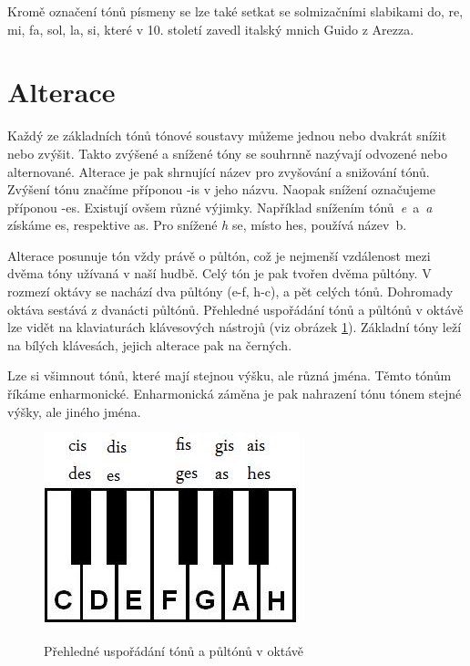 Kromě označení tónů písmeny se lze také setkat se solmizačními slabikami do, re, mi, fa, sol, la, si,
které v 10. století zavedl italský mnich Guido z Arezza.
\cite{cmiral}
\par    

\section{Alterace}
Každý ze základních tónů tónové soustavy můžeme jednou nebo dvakrát snížit nebo zvýšit.
Takto zvýšené a snížené tóny se souhrnně nazývají odvozené nebo alternované.
Alterace je pak shrnující název pro zvyšování a snižování tónů.
Zvýšení tónu značíme příponou -is v jeho názvu.
Naopak snížení označujeme příponou -es.
Existují ovšem různé výjimky.
Například snížením tónů\emph{~e}~a\emph{~a} získáme es, respektive as.
Pro snížené \emph{h} se, místo hes, používá název~b.
\cite{zenkl}
\par

Alterace posunuje tón vždy právě o půltón, 
což je nejmenší vzdálenost mezi dvěma tóny užívaná v naší hudbě.
Celý tón je pak tvořen dvěma půltóny. 
V rozmezí oktávy se nachází dva půltóny ({e-f, h-c}), a pět celých tónů.
Dohromady oktáva sestává z dvanácti půltónů.
Přehledné uspořádání tónů a půltónů v oktávě lze vidět na klaviaturách klávesových nástrojů (viz obrázek \ref{obrazekRozlozeniKlaviatury}).
Základní tóny leží na bílých klávesách, jejich alterace pak na černých.
\cite{zenkl,cmiral}
\par

Lze si všimnout tónů, které mají stejnou výšku, ale různá jména.
Těmto tónům říkáme enharmonické. Enharmonická záměna je pak nahrazení tónu tónem stejné výšky, ale jiného jména.\cite{zenkl}

\begin{figure}[h]\centering
    \centering
    \includegraphics[width=0.4\linewidth]{obrazky/klaviatura.jpg}\\[1pt]  
    \caption{Přehledné uspořádání tónů a půltónů v oktávě \cite{orientaceNaKlaviature}}    
    \label{obrazekRozlozeniKlaviatury}
\end{figure}

